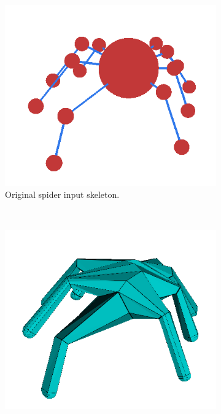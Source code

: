 \begin{figure}
        \centering
        \begin{subfigure}[b]{0.4\textwidth}
        	\centering
                \includegraphics[width=\textwidth]{images/pavuk_kostra.png}
                \caption{Original spider input skeleton.}
                \label{fig:pavuk_skl_1}
        \end{subfigure}%
        ~ %
        \begin{subfigure}[b]{0.4\textwidth}
        	\centering
                \includegraphics[width=\textwidth]{images/pavuk_fail.png}

\end{subfigure}
\end{figure}
